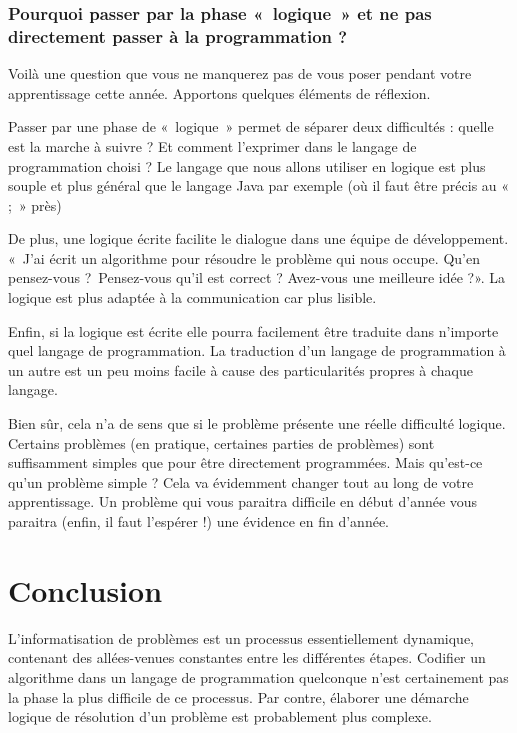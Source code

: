 	\subsubsection*{Pourquoi passer par la phase «~logique~» 
		et ne pas directement passer à la programmation ?}
	
	Voilà une question que vous ne manquerez pas de vous poser pendant votre
	apprentissage cette année. Apportons quelques éléments de réflexion.

	\begin{liste}
	\item
		Passer par une phase de «~logique~» permet de séparer deux difficultés :
		quelle est la marche à suivre ? Et comment l'exprimer
		dans le langage de programmation choisi ? Le langage que nous allons
		utiliser en logique est plus souple et plus général que le langage Java
		par exemple (où il faut être précis au « ;~» près)
	\item
		De plus, une logique écrite facilite le dialogue dans une équipe de
		développement. «~J'ai écrit un algorithme pour
		résoudre le problème qui nous occupe. Qu'en
		pensez-vous ?~Pensez-vous qu'il est correct ?
		Avez-vous une meilleure idée ?». La logique est plus adaptée à la
		communication car plus lisible.
	\item
		Enfin, si la logique est écrite elle pourra facilement être traduite
		dans n'importe quel langage de programmation. La
		traduction d'un langage de programmation à un autre
		est un peu moins facile à cause des particularités propres à chaque
		langage.
	\end{liste}

	Bien sûr, cela n'a de sens que si le problème présente
	une réelle difficulté logique. Certains problèmes (en pratique,
	certaines parties de problèmes) sont suffisamment simples que pour être
	directement programmées. Mais qu'est-ce
	qu'un problème simple ? Cela va évidemment changer
	tout au long de votre apprentissage. Un problème qui vous paraitra
	difficile en début d'année vous paraitra (enfin, il
	faut l'espérer !) une évidence en fin
	d'année.

\section{Conclusion}

	L’informatisation de problèmes est un processus essentiellement
	dynamique, contenant des allées-venues constantes entre les différentes
	étapes. Codifier un algorithme dans un langage de programmation
	quelconque n’est certainement pas la phase la plus difficile de ce
	processus. Par contre, élaborer une démarche logique de résolution d’un
	problème est probablement plus complexe.
	
